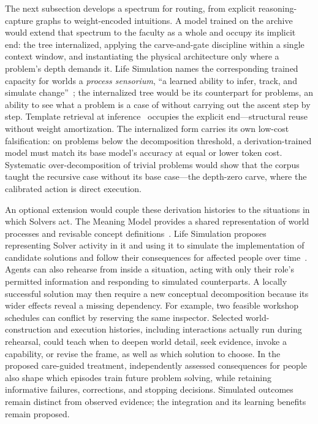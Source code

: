 \documentclass[11pt]{article}
\begin{document}
The next subsection develops a spectrum for routing, from explicit
reasoning-capture graphs to weight-encoded intuitions. A model trained on
the archive would extend that spectrum to the faculty as a whole and occupy
its implicit end: the tree internalized, applying the carve-and-gate
discipline within a single context window, and instantiating the physical
architecture only where a problem's depth demands it. Life Simulation names the
corresponding trained capacity for worlds a \emph{process sensorium}, ``a learned
ability to infer, track, and simulate change''~\cite{westerberg2026lifesimulation};
the internalized tree would be its counterpart for problems, an ability to see what a
problem is a case of without carrying out the ascent step by step. Template retrieval at
inference~\cite{yang2024buffer} occupies the explicit end---structural reuse
without weight amortization. The internalized form carries its own low-cost
falsification: on problems below the decomposition threshold, a
derivation-trained model must match its base model's accuracy at equal or
lower token cost. Systematic over-decomposition of trivial problems would
show that the corpus taught the recursive case without its base case---the
depth-zero carve, where the calibrated action is direct execution.

An optional extension would couple these derivation histories to the situations
in which Solvers act. The Meaning Model provides a shared representation of
world processes and revisable concept definitions~\cite{westerberg2026meaningmodel}.
Life Simulation proposes representing Solver activity in it and using it to simulate the implementation of candidate
solutions and follow their consequences for affected people over time~\cite{westerberg2026lifesimulation}.
Agents can also rehearse from inside a situation, acting with only their role's
permitted information and responding to simulated counterparts. A locally
successful solution may then require a new conceptual decomposition because its
wider effects reveal a missing dependency. For example, two feasible workshop
schedules can conflict by reserving the same inspector. Selected world-construction
and execution histories, including interactions actually run during rehearsal,
could teach when to deepen world detail, seek evidence,
invoke a capability, or revise the frame, as well as which solution to choose.
In the proposed care-guided treatment, independently assessed consequences for
people also shape which episodes train future problem solving, while retaining
informative failures, corrections, and stopping decisions. Simulated
outcomes remain distinct from observed evidence; the integration and its
learning benefits remain proposed.
\end{document}
